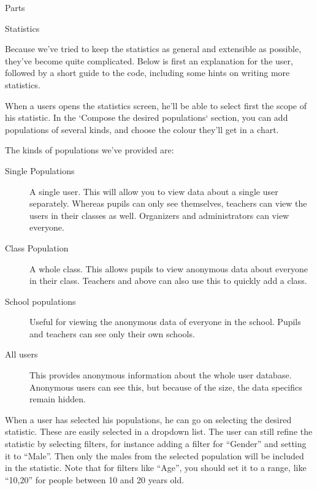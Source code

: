 \documentclass[]{article}
\begin{document}
\begin{section}{Parts}
    \begin{subsection}{Statistics}

        Because we've tried to keep the statistics as general and extensible as
        possible, they've become quite complicated. Below is first an
        explanation for the user, followed by a short guide to the code,
        including some hints on writing more statistics.

        When a users opens the statistics screen, he'll be able to select first
        the scope of his statistic. In the `Compose the desired populations`
        section, you can add populations of several kinds, and choose the colour
        they'll get in a chart.

        The kinds of populations we've provided are:
        \begin{description}
            \item[Single Populations] A single user. This will allow you to view
                data about a single user separately. Whereas pupils can only see
                themselves, teachers can view the users in their classes as
                well. Organizers and administrators can view everyone.
            \item[Class Population] A whole class. This allows pupils to view
                anonymous data about everyone in their class. Teachers and above
                can also use this to quickly add a class.
            \item[School populations] Useful for viewing the anonymous data of
                everyone in the school. Pupils and teachers can see only their
                own schools.
            \item[All users] This provides anonymous information about the whole
                user database. Anonymous users can see this, but because of the
                size, the data specifics remain hidden.
        \end{description}

        When a user has selected his populations, he can go on selecting the
        desired statistic. These are easily selected in a dropdown list. The
        user can still refine the statistic by selecting filters, for
        instance adding a filter for ``Gender'' and setting it to ``Male''. Then
        only the males from the selected population will be included in the
        statistic. Note that for filters like ``Age'', you should set it to a
        range, like ``10,20'' for people between 10 and 20 years old.


\end{subsection}
\end{section}
\end{document}
